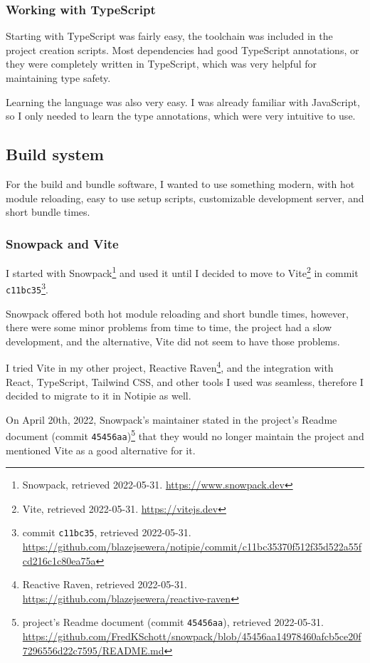 \hypertarget{working-with-typescript}{%
\subsubsection{Working with TypeScript}\label{working-with-typescript}}

Starting with TypeScript was fairly easy, the toolchain was included in
the project creation scripts. Most dependencies had good TypeScript
annotations, or they were completely written in TypeScript, which was
very helpful for maintaining type safety.

Learning the language was also very easy. I was already familiar with
JavaScript, so I only needed to learn the type annotations, which were
very intuitive to use.

\hypertarget{build-system}{%
\subsection{Build system}\label{build-system}}

For the build and bundle software, I wanted to use something modern,
with hot module reloading, easy to use setup scripts, customizable
development server, and short bundle times.

\hypertarget{snowpack-and-vite}{%
\subsubsection{Snowpack and Vite}\label{snowpack-and-vite}}

I started with Snowpack\footnote{Snowpack, retrieved 2022-05-31.
  \url{https://www.snowpack.dev}} and used it until I decided to move to
Vite\footnote{Vite, retrieved 2022-05-31. \url{https://vitejs.dev}} in
commit \texttt{c11bc35}\footnote{commit \texttt{c11bc35}, retrieved
  2022-05-31.
  \url{https://github.com/blazejsewera/notipie/commit/c11bc35370f512f35d522a55fcd216c1c80ea75a}}.

Snowpack offered both hot module reloading and short bundle times,
however, there were some minor problems from time to time, the project
had a slow development, and the alternative, Vite did not seem to have
those problems.

I tried Vite in my other project, Reactive Raven\footnote{Reactive
  Raven, retrieved 2022-05-31.
  \url{https://github.com/blazejsewera/reactive-raven}}, and the
integration with React, TypeScript, Tailwind CSS, and other tools I used
was seamless, therefore I decided to migrate to it in Notipie as well.

On April 20th, 2022, Snowpack's maintainer stated in the project's
Readme document (commit \texttt{45456aa})\footnote{project's Readme
  document (commit \texttt{45456aa}), retrieved 2022-05-31.
  \url{https://github.com/FredKSchott/snowpack/blob/45456aa14978460afcb5ce20f7296556d22c7595/README.md}}
that they would no longer maintain the project and mentioned Vite as a
good alternative for it.
